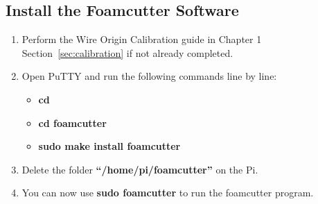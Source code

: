 \documentclass[titlepage,12pt,letter]{report}
\numberwithin{equation}{chapter}
\begin{document}
\subsection{Install the Foamcutter Software}
\label{sec:install}
\begin{enumerate}[noitemsep,topsep=0pt]
\item Perform the Wire Origin Calibration guide in Chapter 1 Section~\ref{sec:calibration} if not already completed.
\item Open PuTTY and run the following commands line by line:
\begin{itemize}[noitemsep,topsep=0pt]
	\item \textbf{cd}
	\item \textbf{cd foamcutter}
	\item \textbf{sudo make install foamcutter}
\end{itemize}
\item Delete the folder \textbf{``/home/pi/foamcutter''} on the Pi.
\item You can now use \textbf{sudo foamcutter} to run the foamcutter program.
\end{enumerate}
\end{document}
